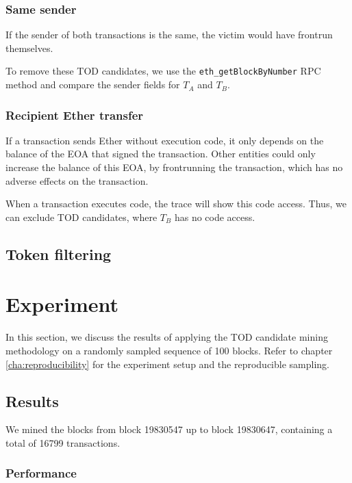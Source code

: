 \documentclass[draft,final]{vutinfth} %
\begin{document}
\subsubsection{Same sender}

If the sender of both transactions is the same, the victim would have frontrun themselves.

To remove these TOD candidates, we use the \verb|eth_getBlockByNumber| RPC method and compare the sender fields for $T_A$ and $T_B$.

\subsubsection{Recipient Ether transfer}

If a transaction sends Ether without execution code, it only depends on the balance of the EOA that signed the transaction. Other entities could only increase the balance of this EOA, by frontrunning the transaction, which has no adverse effects on the transaction.

When a transaction executes code, the trace will show this code access. Thus, we can exclude TOD candidates, where $T_B$ has no code access.

\subsection{Token filtering}


\section{Experiment}

In this section, we discuss the results of applying the TOD candidate mining methodology on a randomly sampled sequence of 100 blocks. Refer to chapter \ref{cha:reproducibility} for the experiment setup and the reproducible sampling.

\subsection{Results}

We mined the blocks from block 19830547 up to block 19830647, containing a total of 16799 transactions.

\subsubsection{Performance}
\end{document}

